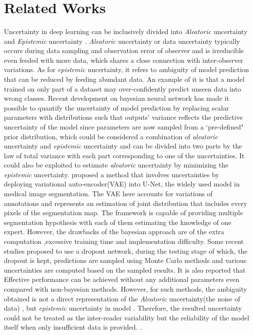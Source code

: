 \documentclass[12pt]{extarticle}
\begin{document}
\section{Related Works}
\paragraph{}
Uncertainty in deep learning can be inclusively divided into \textit{Aleatoric}
uncertainty and \textit{Epistemic} uncertainty \cite{kendall2017uncertainties}.
\textit{Aleatoric} uncertainty or data uncertainty typically occurs during data sampling and
observation error of observer and is irreducible even feeded with more data, which shares a
close connection with inter-observer variations. As for \textit{epistemic}
uncertainty, it refers to ambiguity of model prediction that can be reduced by feeding abundant data.
An example of it is that a model trained on only part of a dataset may over-confidently
predict unseen data into wrong classes. Recent development on 
bayesian neural network has made it possible to quantify the 
uncertainty of model prediction by replacing scalar parameters with distributions such 
that outputs' variance reflects the predictive uncertainty of the model since parameters are now sampled 
from a `pre-defined" prior distribution, which could be considered a 
combination of \textit{aleatoric} uncertainty and \textit{epistemic} uncertainty 
and can be divided into two parts by the law of total variance with each part corresponding to 
one of the uncertainties. It could also be exploited to estimate \textit{aleatoric} uncertainty by 
minimizing the \textit{epistemic} uncertainty. \cite{kohl2019probabilistic} 
proposed a method that involves uncertainties by deploying variational 
auto-encoder(VAE) into U-Net, the widely used model in medical image segmentation\cite{ronneberger2015unet}. 
The VAE here accounts for variations of annotations and represents an 
estimation of joint distribution that includes every pixels of the segmentation map. 
The framework is capable of providing multiple segmentation 
hypothesis with each of them estimating the knowledge of one expert.
However, the drawbacks of the bayesian approach are of the extra computation
,excessive training time and implementation difficulty. 
Some recent studies proposed to use a dropout network, during the testing stage of which, 
the dropout is kept, predictions are sampled using Monte Carlo methods 
and various uncertainties are computed based on the sampled results.
It is also reported that Effective performance can be achieved 
without any additional parameters even compared with non-bayesian methods. 
However, for such methods, the ambiguity obtained is
not a direct representation of the \textit{Aleatoric} uncertainty(the noise of data)
, but \textit{epistemic} uncertainty in model
\cite{kendall2017uncertainties}. Therefore, the resulted uncertainty could not
be treated as the inter-reader variability but the reliability of 
the model itself when only insufficient data is provided. 
\cite{nair_precup_arnold_arbel_2020}. 
\end{document}
